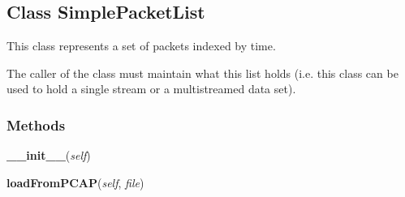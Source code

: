 \subsection{Class SimplePacketList}

    \label{FingerprintAttackClasses:SimplePacketList}
This class represents a set of packets indexed by time.

The caller of the class must maintain what this list holds (i.e. this class
can be used to hold a single stream or a multistreamed data set).



  \subsubsection{Methods}

    \label{FingerprintAttackClasses:SimplePacketList:__init__}

    \vspace{0.5ex}

\hspace{.8\funcindent}\begin{boxedminipage}{\funcwidth}

    \raggedright \textbf{\_\_init\_\_}(\textit{self})

\setlength{\parskip}{2ex}
\setlength{\parskip}{1ex}
    \end{boxedminipage}

    \label{FingerprintAttackClasses:SimplePacketList:loadFromPCAP}

    \vspace{0.5ex}

\hspace{.8\funcindent}\begin{boxedminipage}{\funcwidth}

    \raggedright \textbf{loadFromPCAP}(\textit{self}, \textit{file})

\setlength{\parskip}{2ex}
\setlength{\parskip}{1ex}
    \end{boxedminipage}

